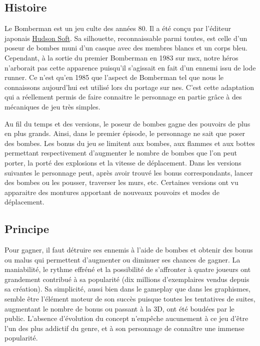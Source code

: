 
\subsection{Histoire}

Le Bomberman est un jeu culte des années 80. Il a été conçu par l'éditeur japonais \href{http://www.hudsonsoft.net/}{Hudson Soft}. Sa silhouette, reconnaissable parmi toutes, est celle d'un poseur de bombes muni d'un casque avec des membres blancs et un corps bleu. Cependant, à la sortie du premier Bomberman en 1983 sur \gls{msx}, notre héros n'arborait pas cette apparence puisqu'il s'agissait en fait d'un ennemi issu de \gls{lode runner}. Ce n'est qu'en 1985 que l'aspect de Bomberman tel que nous le connaissons aujourd'hui est utilisé lors du portage sur \gls{nes}. C'est cette adaptation qui a réellement permis de faire connaitre le personnage en partie grâce à des mécaniques de jeu très simples.

Au fil du temps et des versions, le poseur de bombes gagne des pouvoirs de plus en plus grands. Ainsi, dans le premier épisode, le personnage ne sait que poser des bombes. Les bonus du jeu se limitent aux bombes, aux flammes et aux bottes permettant respectivement d'augmenter le nombre de bombes que l'on peut porter, la porté des explosions et la vitesse de déplacement. Dans les versions suivantes le personnage peut, après avoir trouvé les bonus correspondants, lancer des bombes ou les pousser, traverser les murs, etc. Certaines versions ont vu apparaitre des montures apportant de nouveaux pouvoirs et modes de déplacement.


\subsection{Principe}
Pour gagner, il faut détruire ses ennemis à l'aide de bombes et obtenir des bonus ou malus qui permettent d'augmenter ou diminuer ses chances de gagner. La maniabilité, le rythme effréné et la possibilité de s’affronter à quatre joueurs ont grandement contribué à sa popularité (dix millions d’exemplaires vendus depuis sa création). Sa simplicité, aussi bien dans le gameplay que dans les graphismes, semble être l’élément moteur de son succès puisque toutes les tentatives de suites, augmentant le nombre de bonus ou passant à la 3D, ont été boudées par le public. L’absence d’évolution du concept n’empêche aucunement à ce jeu d’être l’un des plus addictif du genre, et à son personnage de connaître une immense popularité. 
